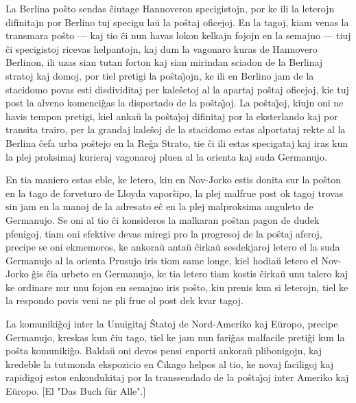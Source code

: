    La Berlina po\^sto sendas \^ciutage Hannoveron specigistojn, por ke
ili la leterojn difinitajn por Berlino tuj specigu la\u u la
po\^staj oficejoj. En la tagoj, kiam venas la transmara po\^sto
--- kaj tio \^ci nun havas lokon kelkajn fojojn en la semajno
--- tiuj \^ci specigistoj ricevas helpantojn, kaj dum la vagonaro
kuras de Hannovero Berlinon, ili uzas sian tutan forton kaj sian
mirindan sciadon de la Berlinaj stratoj kaj domoj, por tiel pretigi
la po\^sta\^{\j}ojn, ke ili en Berlino jam de la stacidomo povas
esti disdividitaj per kale\^setoj al la apartaj po\^staj oficejoj,
kie tuj post la alveno komenci\^gas la disportado de la
po\^sta\^{\j}oj. La po\^sta\^{\j}oj, kiujn oni ne havis tempon
pretigi, kiel anka\u u la po\^sta\^{\j}oj difinitaj por la
eksterlando kaj por transita trairo, per la grandaj kale\^soj de la
stacidomo estas alportataj rekte al la Berlina \^cefa urba po\^stejo
en la Re\^ga Strato, tie \^ci ili estas specigataj kaj iras kun la
plej proksimaj kurieraj vagonaroj pluen al la orienta kaj suda
Germanujo.

   En tia maniero estas eble, ke letero, kiu en Nov-Jorko estis donita
sur la po\^ston en la tago de forveturo de Lloyda vapor\^sipo, la
plej malfrue post ok tagoj trovas sin jam en la manoj de la adresato
e\^c en la plej malproksima anguleto de Germanujo. Se oni al tio
\^ci konsideros la malkaran po\^stan pagon de dudek pfenigoj, tiam
oni efektive devas miregi pro la progresoj de la po\^staj aferoj,
precipe se oni ekmemoros, ke ankora\u u anta\u u \^cirka\u u
sesdekjaroj letero el la suda Germanujo al la orienta Prusujo iris
tiom same longe, kiel hodia\u u letero el Nov-Jorko \^gis \^cia
urbeto en Germanujo, ke tia letero tiam kostis \^cirka\u u unu
talero kaj ke ordinare nur unu fojon en semajno iris po\^sto, kiu
prenis kun si leterojn, tiel ke la respondo povis veni ne pli frue
ol post dek kvar tagoj.

   La komuniki\^goj inter la Unuigitaj \^Statoj de Nord-Ameriko kaj
E\u uropo, precipe Germanujo, kreskas kun \^ciu tago, tiel ke jam
nun fari\^gas malfacile preti\^gi kun la po\^sta komuniki\^go.
Balda\u u oni devos pensi enporti ankora\u u plibonigojn, kaj
kredeble la tutmonda ekspozicio en \^Cikago helpos al tio, ke novaj
faciligoj kaj rapidigoj estos enkondukitaj por la transsendado de la
po\^sta\^{\j}oj inter Ameriko kaj E\u uropo. [El "Das Buch für
Alle".]

\smallrule{}
